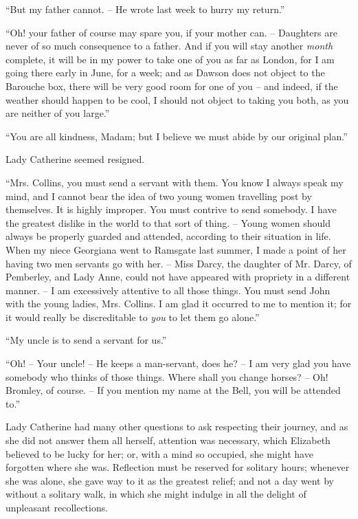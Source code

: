“But my father cannot. -- He wrote last week to hurry
my return.”

“Oh! your father of course may spare you, if your
mother can. -- Daughters are never of so much consequence
to a father. And if you will stay another \textit{month} complete,
it will be in my power to take one of you as far as London,
for I am going there early in June, for a week; and as
Dawson does not object to the Barouche box, there
will be very good room for one of you -- and indeed,
if the weather should happen to be cool, I should not
object to taking you both, as you are neither of you
large.”

“You are all kindness, Madam; but I believe we must
abide by our original plan.”

Lady Catherine seemed resigned.

“Mrs. Collins, you must send a servant with them.
You know I always speak my mind, and I cannot bear the
idea of two young women travelling post by themselves.
It is highly improper. You must contrive to send somebody.
I have the greatest dislike in the world to that
sort of thing. -- Young women should always be properly
guarded and attended, according to their situation in
life. When my niece Georgiana went to Ramsgate last
summer, I made a point of her having two men servants
go with her. -- Miss Darcy, the daughter of Mr. Darcy,
of Pemberley, and Lady Anne, could not have appeared
with propriety in a different manner. -- I am excessively
attentive to all those things. You must send John with
the young ladies, Mrs. Collins. I am glad it occurred to
me to mention it; for it would really be discreditable to
\textit{you} to let them go alone.”

“My uncle is to send a servant for us.”

“Oh! -- Your uncle! -- He keeps a man-servant, does
he? -- I am very glad you have somebody who thinks of
those things. Where shall you change horses? -- Oh!
Bromley, of course. -- If you mention my name at the
Bell, you will be attended to.”

Lady Catherine had many other questions to ask
respecting their journey, and as she did not answer them
all herself, attention was necessary, which Elizabeth
believed to be lucky for her; or, with a mind so occupied,
she might have forgotten where she was. Reflection
must be reserved for solitary hours; whenever she was
alone, she gave way to it as the greatest relief; and
not a day went by without a solitary walk, in which
she might indulge in all the delight of unpleasant
recollections.

